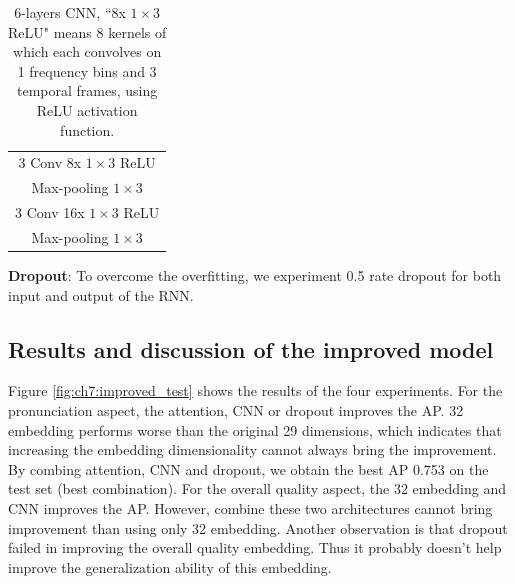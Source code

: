 \begin{table}[ht!]
\centering
\caption{6-layers CNN,  ``8x $1\times3$ ReLU" means 8 kernels of which each convolves on 1 frequency bins and 3 temporal frames, using ReLU activation function.}
\label{table:ch7:cnn}
\begin{tabular}{c}
\toprule
3 Conv 8x $1{\times}3$ ReLU\\
Max-pooling $1{\times}3$ \\
3 Conv 16x $1{\times}3$ ReLU\\
Max-pooling $1{\times}3$ \\
\bottomrule
\end{tabular}
\end{table}

\textbf{Dropout}: To overcome the overfitting, we experiment 0.5 rate dropout for both input and output of the RNN.

\subsection{Results and discussion of the improved model}

Figure \ref{fig:ch7:improved_test} shows the results of the four experiments. For the pronunciation aspect, the attention, CNN or dropout improves the AP. 32 embedding performs worse than the original 29 dimensions, which indicates that increasing the embedding dimensionality cannot always bring the improvement. By combing attention, CNN and dropout, we obtain the best AP 0.753 on the test set (best combination). For the overall quality aspect, the 32 embedding and CNN improves the AP. However, combine these two architectures cannot bring improvement than using only 32 embedding. Another observation is that dropout failed in improving the overall quality embedding. Thus it probably doesn't help improve the generalization ability of this embedding.

